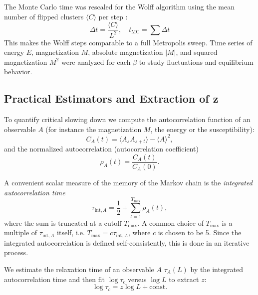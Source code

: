 The Monte Carlo time was rescaled for the Wolff algorithm using the mean number of flipped clusters $\langle C \rangle$ per step \cite{LandauMonteCarlo}:
\begin{equation}
    \Delta t = \frac{\langle C\rangle}{L^2}, \quad
    t_\text{MC} = \sum \Delta t
\end{equation}
This makes the Wolff steps comparable to a full Metropolis sweep.
Time series of energy $E$, magnetization $M$, absolute magnetization $|M|$, and squared magnetization $M^2$ were analyzed for each $\beta$ to study fluctuations and equilibrium behavior.

\subsection{Practical Estimators and Extraction of z} \label{section:PracticalEstimators}

To quantify critical slowing down we compute the autocorrelation function of an observable \(A\) (for instance the magnetization \(M\), the energy or the susceptibility):
\begin{equation}
C_A(t) = \langle A_{s} A_{s+t}\rangle - \langle A\rangle^2,
\end{equation}
and the normalized autocorrelation (autocorrelation coefficient)
\begin{equation}
    \rho_A(t) = \frac{C_A(t)}{C_A(0)}.
\end{equation}

A convenient scalar measure of the memory of the Markov chain is the
\emph{integrated autocorrelation time}
\begin{equation}
\tau_{\mathrm{int},A} = \frac{1}{2} + \sum_{t=1}^{T_{\max}} \rho_A(t),
\end{equation}
where the sum is truncated at a cutoff \(T_{\max}\).
A common choice of \(T_{\max}\) is a multiple of \(\tau_{\mathrm{int},A}\) itself, i.e. \(T_{\max} = c \tau_{\mathrm{int},A}\), where \(c\) is chosen to be 5.
Since the integrated autocorrelation is defined self-consistently, this is done in an iterative process.

We estimate the relaxation time of an observable \(A\) \(\tau_A(L)\) by the
integrated autocorrelation time and then fit \(\log \tau_c\) versus \(\log L\) to extract \(z\):
\begin{equation}
\log \tau_c = z \log L + \text{const}.
\end{equation}